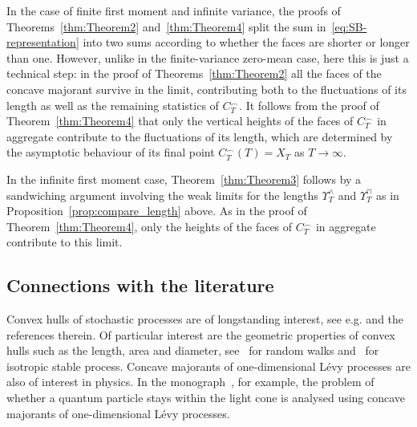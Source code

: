 \documentclass[10pt]{amsart}
\theoremstyle{definition}\newtheorem{defi}[theo]{Definition}\newtheorem{rema}[theo]{Remark}\newtheorem{exam}[theo]{Example}\newtheorem{exem}[theo]{Example}\newtheorem{nota}[theo]{Notation}
\newcommand\1{\mathds{1}}
\begin{document}
In the case of finite first moment and infinite variance, the proofs of Theorems~\ref{thm:Theorem2} and~\ref{thm:Theorem4} split the sum in~\eqref{eq:SB-representation} into two sums according to whether the faces are shorter or longer than one. However, unlike in the finite-variance zero-mean case, here this is just a technical step: in the proof of Theorems~\ref{thm:Theorem2} all the faces of the concave majorant survive in the limit, contributing both to the fluctuations of its length as well as the remaining statistics of $C_T^\frown$. It follows from the proof of Theorem~\ref{thm:Theorem4} that only the vertical heights of the faces of $C_T^\frown$ in aggregate contribute to the fluctuations of its length, which are determined by the asymptotic behaviour of its final point $C_T^\frown(T)=X_T$ as $T\to\infty$.

In the infinite first moment case, Theorem~\ref{thm:Theorem3} follows by a sandwiching argument involving the weak limits for the lengths $\Upsilon_T^\wedge$ and $\Upsilon_T^\sqcap$ as in Proposition~\ref{prop:compare_length} above. As in the proof of Theorem~\ref{thm:Theorem4}, only the heights of the faces of $C_T^\frown$ in aggregate contribute to this limit.

\subsection{Connections with the literature}\label{subsec:lit}
Convex hulls of stochastic processes are of longstanding interest, see e.g.\:\!\cite{PitmanBravoCMLP} and the references therein. Of particular interest are the geometric properties of convex hulls such as the length, area and diameter, see~\cite{RWpaper,MR3896868,randonfurling2020convex,MR3272767,MR3385604} for random walks and~\cite{MR2898714} for isotropic stable process. Concave majorants of one-dimensional Lévy processes are also of interest in physics. In the monograph~\cite[Chapter~XI]{MR1739699}, for example, the problem of whether a quantum particle stays within the light cone is analysed using concave majorants of one-dimensional Lévy processes.
\end{document}
